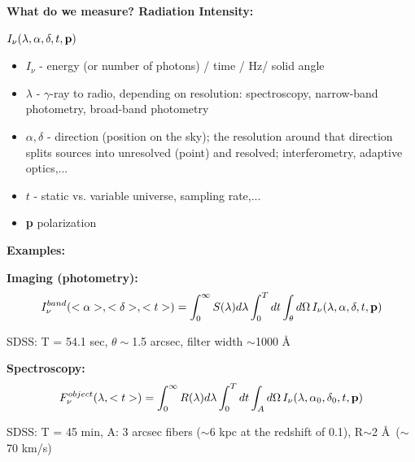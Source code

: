 \documentclass[letterpaper,landscape]{slides}
\begin{document}
\begin{slide}
\begin{center}
\bfseries
{\large {\color{red} What do we measure? \color{blue} Radiation Intensity:}}
\end{center}
\vskip 0.6in

{\centerline {\Huge \bf {\color{blue} 
 $I_\nu (\lambda, \alpha, \delta, t, {\bf p})$ }}}

\begin{itemize}

\item $I_\nu$ - energy (or number of photons) / time / Hz/ solid angle 
\item $\lambda$ - $\gamma$-ray to radio, depending on resolution:
      spectroscopy, narrow-band photometry, broad-band photometry
\item $\alpha, \delta$ - direction (position on the sky); the resolution 
    around that direction splits sources into unresolved (point) and resolved;
    interferometry, adaptive optics,...
\item $t$ - static vs. variable universe, sampling rate,...
\item {\bf p} polarization
\end{itemize}
\end{slide}
 



\begin{slide}
\begin{center}
\bfseries
{\large {\color{red} Examples:}}
\end{center}

\vskip 0.6in

{\bf Imaging (photometry):}
\begin{equation}
  I_\nu^{band}(<\alpha>, <\delta>, <t>) = \int_{0}^{\infty} S(\lambda)d\lambda 
\int_{0}^T dt \int_{\theta}d\Omega  \, I_\nu (\lambda, \alpha, \delta, t, {\bf p}) 
\end{equation}

{\color{red} SDSS: \color{blue} T = 54.1 sec, $\theta \sim$1.5 arcsec, filter width $\sim$1000 \AA}

{\bf Spectroscopy:}
\begin{equation}
  F_{\nu}^{object}(\lambda, <t>) = \int_{0}^{\infty} R(\lambda)d\lambda 
\int_{0}^T dt \int_{A}d\Omega  \, I_\nu (\lambda, \alpha_0, \delta_0, t, {\bf p}) 
\end{equation}

{\color{red} SDSS: \color{blue} T = 45 min, A: 3 arcsec fibers ($\sim$6 kpc at the redshift of 0.1),
R$\sim$2 \AA \, ($\sim$70 km/s)}

\end{slide}
 
\end{document}
